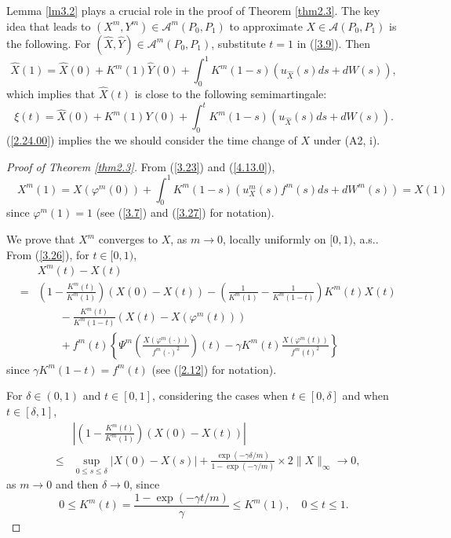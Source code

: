 \documentclass[12pt]{article}
\begin{document}
Lemma \ref{lm3.2} plays a crucial role in the proof of Theorem \ref{thm2.3}.
The key idea that leads to $(X^m, Y^m)\in\mathcal{A}^m(P_0,P_1)$ to approximate 
$X\in\mathcal{A}(P_0,P_1)$ is the following.
For $(\hat X, \hat Y)\in\mathcal{A}^m(P_0,P_1)$,
substitute $t=1$ in (\ref{3.9}). Then 
$$\hat X(1)=\hat X(0)+K^m(1) \hat Y(0)+\int_{0}^{1} K^m(1-s)(u_{\hat X}(s)ds +d W(s)),
$$
which implies that $\hat X(t)$ is close to the following semimartingale:
$$\xi (t)=\hat X(0)+K^m(1) Y(0)+\int_{0}^{t} K^m(1-s)(u_{\hat X}(s)ds +d W(s)).$$
(\ref{2.24.00}) implies the we should consider the time change of $X$ under (A2, i).

\begin{proof}[Proof of Theorem \ref{thm2.3}]

From (\ref{3.23}) and (\ref{4.13.0}), 
\begin{equation}
\quad X^m(1)%
=X(\varphi^m(0))+\int_{0}^{1} K^m(1-s)(u_X^m(s)f^m(s)ds +d W^m(s))=X(1)
\end{equation}
since $\varphi^m(1)=1$ (see  (\ref{3.7}) and (\ref{3.27}) for notation).

We prove that $X^m$ converges  to $X$, as $m\to 0$, locally uniformly on $[0,1)$, a.s..
From (\ref{3.26}), for $t\in [0,1)$,
\begin{eqnarray}%
&&X^m(t)-X(t)\\
&=&\left(1-\frac{K^m(t)}{K^m(1)}\right)(X(0)-X(t))
-\left(\frac{1}{K^m(1)}-\frac{1}{K^m(1-t)}\right)K^m(t)X(t)\nonumber\\
&&\qquad -\frac{K^m(t)}{K^m(1-t)}(X(t)-X(\varphi^m(t)))\nonumber\\
&&\qquad 
+f^m(t)\left\{\Psi^m\left(\frac{X(\varphi^m(\cdot))}{f^m(\cdot)^2}\right)(t)
-\gamma K^m(t)\frac{X(\varphi^m(t))}{f^m(t)^2}\right\}\nonumber
\end{eqnarray}
since $\gamma K^m (1-t)=f^m(t)$ (see (\ref{2.12}) for notation).

For $\delta\in (0,1)$ and $t\in [0,1]$, considering the cases when $t\in [0,\delta]$ and when  $t\in [\delta,1]$,
\begin{eqnarray}
&&\left|\left(1-\frac{K^m(t)}{K^m(1)}\right)(X(0)-X(t))\right|\\
& \le& \sup_{0\le s\le \delta}|X(0)-X(s)|
+\frac{\exp(-\gamma\delta/m)}{1-\exp(-\gamma/m)}\times 2\|X\|_{\infty}\to 0,\nonumber
\end{eqnarray}
as $m\to 0$ and then $\delta\to 0$, since 
\begin{equation}\label{4.21}
0\le K^m(t)=\frac{1-\exp(-\gamma t/m)}{\gamma}\le K^m(1), \quad 0\le t\le 1.
\end{equation}


\end{proof}
\end{document}
